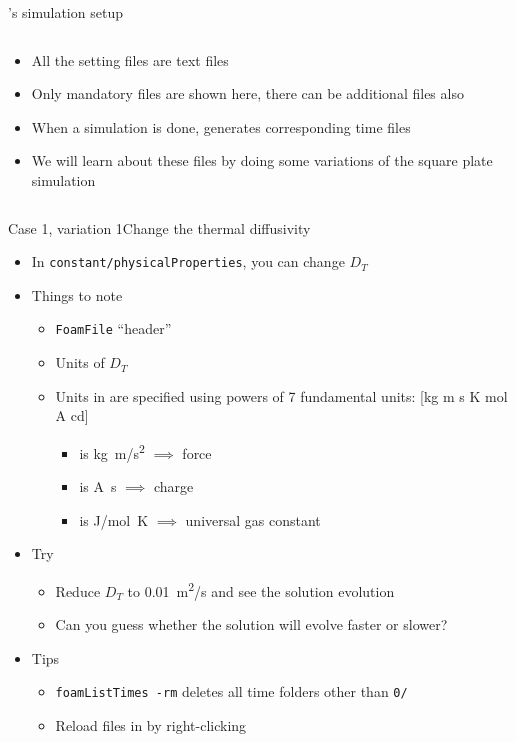 \begin{frame}{\openfoam's simulation setup}
\begin{columns}
\begin{column}{0.5\linewidth}
\begin{itemize}
                \item All the setting files are text files
                \item Only mandatory files are shown here, there can be additional files also
                \item When a simulation is done, \openfoam{} generates corresponding time files
                \item We will learn about these files by doing some variations of the square plate simulation
            \end{itemize}
        \end{column}
    \end{columns}
\end{frame}

\begin{frame}{Case 1, variation 1}{Change the thermal diffusivity}
    \begin{itemize}
        \setitemsep{1em}
        \item In \texttt{constant/physicalProperties}, you can change $D_T$
        \item Things to note
        \begin{itemize}
            \item \texttt{FoamFile} ``header''
            \item Units of $D_T$
            \item Units in \openfoam{} are specified using powers of 7 fundamental units: [\unit{kg} \unit{m} \unit{s} \unit{K} \unit{mol} \unit{A} \unit{cd}]
            \begin{itemize}
                \item {} is \unit{kg.m/s^2} $\implies$ force
                \item {} is \unit{A.s} $\implies$ charge
                \item {} is \unit{J/mol.K} $\implies$ universal gas constant
            \end{itemize}
        \end{itemize}
        \item Try
        \begin{itemize}
            \item Reduce $D_T$ to \qty{0.01}{m^2/s} and see the solution evolution
            \item Can you guess whether the solution will evolve faster or slower?
        \end{itemize}
        \item Tips
        \begin{itemize}
            \item \texttt{foamListTimes -rm} deletes all time folders other than \texttt{0/}
            \item Reload files in \paraview{} by right-clicking
        \end{itemize}
    \end{itemize}
\end{frame}

